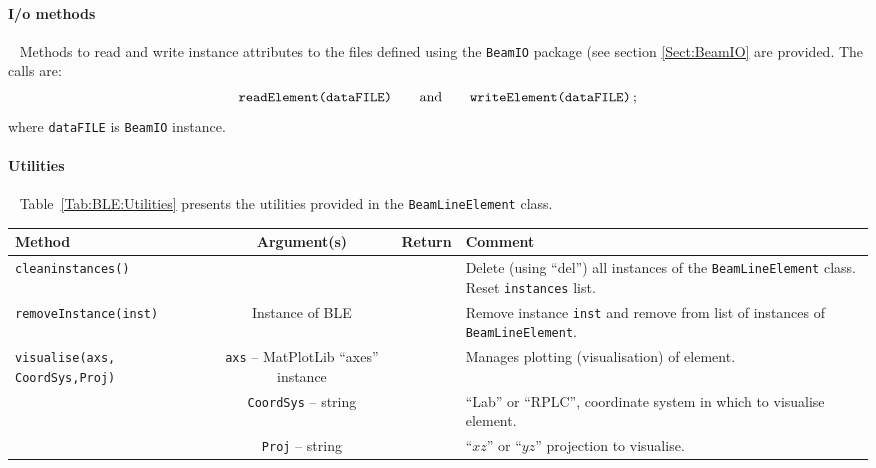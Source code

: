 \paragraph{I/o methods} ~\newline
\noindent
Methods to read and write instance attributes to the files defined
using the \texttt{BeamIO} package (see section \ref{Sect:BeamIO} are
provided.
The calls are:
\begin{equation}
  \texttt{readElement(dataFILE)} \quad \quad {\rm and }
      \quad \quad \texttt{writeElement(dataFILE)} \,; \nonumber
\end{equation}
where \texttt{dataFILE} is \texttt{BeamIO} instance. 

\paragraph{Utilities} ~\newline
\noindent
Table~\ref{Tab:BLE:Utilities} presents the utilities provided in the
\texttt{BeamLineElement} class.
\begin{sidewaystable}[h]
  \caption{
    Utilities provided by the \texttt{BeamLineElement}
    class. 
  }
  \label{Tab:BLE:Utilities}
  \begin{center}
    \begin{tabular}{|l|c|c|p{10cm}|}
      \hline
      \textbf{Method} & \textbf{Argument(s)} & \textbf{Return} & \textbf{Comment}                                            \\
      \hline
      \texttt{cleaninstances()}     &                 &  & Delete (using ``del'') all instances of the \texttt{BeamLineElement} class.
                                                           Reset \texttt{instances} list. \\
      \texttt{removeInstance(inst)} & Instance of BLE &  & Remove instance \texttt{inst} and remove from list of instances of
                                                           \texttt{BeamLineElement}. \\
      \texttt{visualise(axs, CoordSys,Proj)} & \texttt{axs} -- MatPlotLib ``axes'' instance &  & Manages plotting (visualisation) of element.  \\
                                             & \texttt{CoordSys} -- string                  &  & ``Lab'' or ``RPLC'', coordinate system in which to visualise element. \\
                                             & \texttt{Proj} -- string                      &  & ``$xz$'' or ``$yz$'' projection to visualise. \\
      \hline
    \end{tabular}
  \end{center}
\end{sidewaystable}

